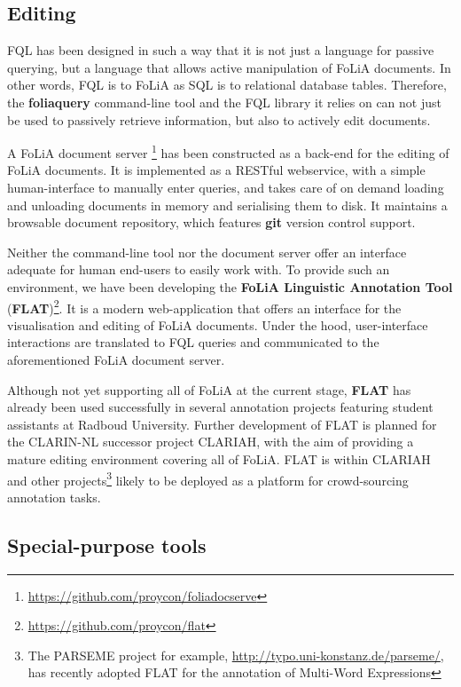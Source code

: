 \documentclass[a4paper,11pt]{article}
\begin{document}
\subsection{Editing}

FQL has been designed in such a way that it is not just a language for passive
querying, but a language that allows active manipulation of FoLiA documents. In
other words, FQL is to FoLiA as SQL is to relational database tables.
Therefore, the \textbf{foliaquery} command-line tool and the FQL library it relies on
can not just be used to passively retrieve information, but also to actively
edit documents.

A FoLiA document server \footnote{\url{https://github.com/proycon/foliadocserve}} has
been constructed as a back-end for the editing of FoLiA documents. It is
implemented as a RESTful webservice, with a simple human-interface to manually
enter queries, and takes care of on demand loading and unloading documents in
memory and serialising them to disk. It maintains a browsable document
repository, which features \textbf{git} version control support.

Neither the command-line tool nor the document server offer an
interface adequate for human end-users to easily work with. To provide
such an environment, we have been developing the \textbf{FoLiA Linguistic Annotation Tool}
(\textbf{FLAT})\footnote{\url{https://github.com/proycon/flat}}. It is a modern
web-application that offers an interface for the visualisation and editing of
FoLiA documents. Under the hood, user-interface interactions are translated to FQL
queries and communicated to the aforementioned FoLiA document server.

Although not yet supporting all of FoLiA at the current stage, \textbf{FLAT}
has already been used successfully in several annotation projects featuring
student assistants at Radboud University. Further development of FLAT is
planned for the CLARIN-NL successor project CLARIAH, with the aim of providing
a mature editing environment covering all of FoLiA. FLAT is within CLARIAH and
other projects\footnote{The PARSEME project for example,
\url{http://typo.uni-konstanz.de/parseme/}, has recently adopted FLAT for the
annotation of Multi-Word Expressions} likely to be deployed as a platform for
crowd-sourcing annotation tasks.

\subsection{Special-purpose tools}
\end{document}
